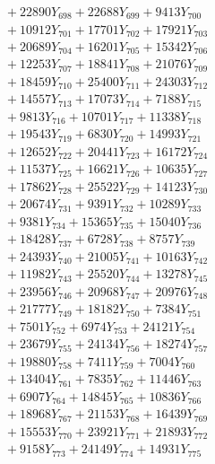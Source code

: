 \documentclass[a4paper,10pt]{article}
\begin{document}
{\begin{align}
&\;  + 22890 Y_{698} + 22688 Y_{699} + 9413 Y_{700} \\[0.3ex]
&\;  + 10912 Y_{701} + 17701 Y_{702} + 17921 Y_{703} \\[0.3ex]
&\;  + 20689 Y_{704} + 16201 Y_{705} + 15342 Y_{706} \\[0.3ex]
&\;  + 12253 Y_{707} + 18841 Y_{708} + 21076 Y_{709} \\[0.3ex]
&\;  + 18459 Y_{710} + 25400 Y_{711} + 24303 Y_{712} \\[0.3ex]
&\;  + 14557 Y_{713} + 17073 Y_{714} + 7188 Y_{715} \\[0.3ex]
&\;  + 9813 Y_{716} + 10701 Y_{717} + 11338 Y_{718} \\[0.5ex]\allowbreak
&\;  + 19543 Y_{719} + 6830 Y_{720} + 14993 Y_{721} \\[0.3ex]
&\;  + 12652 Y_{722} + 20441 Y_{723} + 16172 Y_{724} \\[0.3ex]
&\;  + 11537 Y_{725} + 16621 Y_{726} + 10635 Y_{727} \\[0.3ex]
&\;  + 17862 Y_{728} + 25522 Y_{729} + 14123 Y_{730} \\[0.3ex]
&\;  + 20674 Y_{731} + 9391 Y_{732} + 10289 Y_{733} \\[0.3ex]
&\;  + 9381 Y_{734} + 15365 Y_{735} + 15040 Y_{736} \\[0.3ex]
&\;  + 18428 Y_{737} + 6728 Y_{738} + 8757 Y_{739} \\[0.3ex]
&\;  + 24393 Y_{740} + 21005 Y_{741} + 10163 Y_{742} \\[0.3ex]
&\;  + 11982 Y_{743} + 25520 Y_{744} + 13278 Y_{745} \\[0.3ex]
&\;  + 23956 Y_{746} + 20968 Y_{747} + 20976 Y_{748} \\[0.5ex]\allowbreak
&\;  + 21777 Y_{749} + 18182 Y_{750} + 7384 Y_{751} \\[0.3ex]
&\;  + 7501 Y_{752} + 6974 Y_{753} + 24121 Y_{754} \\[0.3ex]
&\;  + 23679 Y_{755} + 24134 Y_{756} + 18274 Y_{757} \\[0.3ex]
&\;  + 19880 Y_{758} + 7411 Y_{759} + 7004 Y_{760} \\[0.3ex]
&\;  + 13404 Y_{761} + 7835 Y_{762} + 11446 Y_{763} \\[0.3ex]
&\;  + 6907 Y_{764} + 14845 Y_{765} + 10836 Y_{766} \\[0.3ex]
&\;  + 18968 Y_{767} + 21153 Y_{768} + 16439 Y_{769} \\[0.3ex]
&\;  + 15553 Y_{770} + 23921 Y_{771} + 21893 Y_{772} \\[0.3ex]
&\;  + 9158 Y_{773} + 24149 Y_{774} + 14931 Y_{775} \\[0.3ex]

\end{align}}
\end{document}

